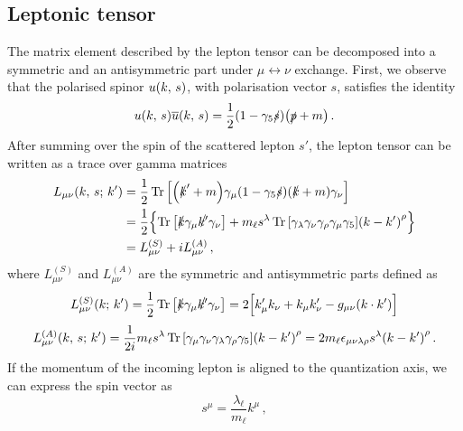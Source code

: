 \subsection*{Leptonic tensor}
The matrix element described by the lepton tensor can be decomposed into a symmetric and an antisymmetric part under $\mu \leftrightarrow \nu$ exchange. First, we observe that the polarised spinor $u \qty(k, \, s)$, with polarisation vector $s$, satisfies the identity 
\begin{equation}
    u \qty(k, \, s) \overline{u} \qty(k,\,s) = \frac{1}{2} (1 - \gamma_5 \slashed{s})  \qty(\slashed{p} + m)\,.
\end{equation}
After summing over the spin of the scattered lepton $s'$, the lepton tensor can be written as a trace over gamma matrices
\begin{equation}
    \begin{split}
        L_{\mu \nu} \qty(k,\,s;\, k') &= \frac{1}{2} \Trace \qty[ \qty(\slashed{k}' + m) \gamma_{\mu} \qty(1 - \gamma_5 \slashed{s}) \qty(\slashed{k} + m) \gamma_{\nu} ]\\
        & = \frac{1}{2} \Bigl\{ \Trace \qty[ \slashed{k} \gamma_{\mu} \slashed{k'} \gamma_{\nu} ] + m_{\ell} s^{\lambda} \Trace \qty[ \gamma_{\lambda} \gamma_{\nu} \gamma_{\rho} \gamma_{\mu} \gamma_{5} ] \qty( k - k' )^{\rho} \Bigr\}\\
        & = L_{\mu \nu}^{(S)} + i L_{\mu \nu}^{(A)} \,,
    \end{split}
\end{equation}
where $L_{\mu \nu}^{(S)}$ and $L_{\mu \nu}^{(A)}$ are the symmetric and antisymmetric parts defined as 
\begin{equation}
  L_{\mu \nu}^{(S)} \qty(k;\, k') = \frac{1}{2} \Trace \qty[ \slashed{k} \gamma_{\mu} \slashed{k'} \gamma_{\nu} ] = 2 \Bigl[k'_{\mu} k_{\nu} + k_{\mu} k_{\nu}' - g_{\mu \nu} \qty( k \cdot k' ) \Bigr]
\end{equation}
\begin{equation}
  L_{\mu \nu}^{(A)} \qty(k,\,s;\, k') = \frac{1}{2i} m_{\ell} s^{\lambda} \Trace \qty[  \gamma_{\mu} \gamma_{\nu} \gamma_{\lambda} \gamma_{\rho} \gamma_{5} ] \qty( k - k' )^{\rho} = 2m_{\ell} \epsilon_{\mu \nu \lambda \rho } s^{\lambda} \qty( k - k' )^{\rho}\,.
\end{equation}
If the momentum of the incoming lepton is aligned to the quantization axis, we can express the spin vector as
\begin{equation}
    s^{\mu} = \frac{\lambda_{\ell}}{m_{\ell}} k^{\mu}\, ,
    \label{eq:ch2:spin_vector}
\end{equation}
